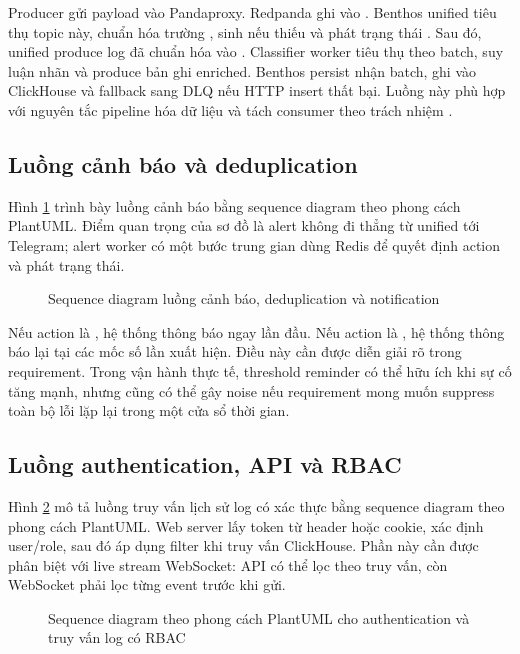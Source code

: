 Producer gửi payload vào Pandaproxy. Redpanda ghi vào . Benthos unified tiêu thụ topic này, chuẩn hóa trường , sinh  nếu thiếu và phát trạng thái . Sau đó, unified produce log đã chuẩn hóa vào . Classifier worker tiêu thụ theo batch, suy luận nhãn và produce bản ghi enriched. Benthos persist nhận batch, ghi vào ClickHouse và fallback sang DLQ nếu HTTP insert thất bại. Luồng này phù hợp với nguyên tắc pipeline hóa dữ liệu và tách consumer theo trách nhiệm \cite{narkhede2017,kleppmann2017}.

\subsection{Luồng cảnh báo và deduplication}

Hình \ref{fig:seq-alert} trình bày luồng cảnh báo bằng sequence diagram theo phong cách PlantUML. Điểm quan trọng của sơ đồ là alert không đi thẳng từ unified tới Telegram; alert worker có một bước trung gian dùng Redis để quyết định action và phát trạng thái.

\begin{figure}[H]
\centering
\makebox[\textwidth][c]{}
\caption{Sequence diagram luồng cảnh báo, deduplication và notification}
\label{fig:seq-alert}
\end{figure}

Nếu action là , hệ thống thông báo ngay lần đầu. Nếu action là , hệ thống thông báo lại tại các mốc số lần xuất hiện. Điều này cần được diễn giải rõ trong requirement. Trong vận hành thực tế, threshold reminder có thể hữu ích khi sự cố tăng mạnh, nhưng cũng có thể gây noise nếu requirement mong muốn suppress toàn bộ lỗi lặp lại trong một cửa sổ thời gian.

\subsection{Luồng authentication, API và RBAC}

Hình \ref{fig:seq-rbac} mô tả luồng truy vấn lịch sử log có xác thực bằng sequence diagram theo phong cách PlantUML. Web server lấy token từ header hoặc cookie, xác định user/role, sau đó áp dụng filter khi truy vấn ClickHouse. Phần này cần được phân biệt với live stream WebSocket: API có thể lọc theo truy vấn, còn WebSocket phải lọc từng event trước khi gửi.

\begin{figure}[H]
\centering
\makebox[\textwidth][c]{}
\caption{Sequence diagram theo phong cách PlantUML cho authentication và truy vấn log có RBAC}
\label{fig:seq-rbac}
\end{figure}

